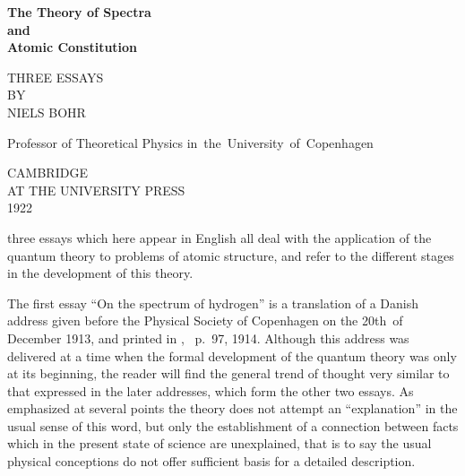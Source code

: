 {\small\raggedright
 \TransNoteText

 }
\iffalse
The Theory of Spectra
and
Atomic Constitution
\PageSep{ii}

CAMBRIDGE UNIVERSITY PRESS
C. F. CLAY, Manager
LONDON : FETTER LANE, E.C. 4


LONDON : H. K. LEWIS AND CO., Ltd.,
136 Gower Street, W.C. 1
NEW YORK : THE MACMILLAN CO.
BOMBAY   }
CALCUTTA } MACMILLAN AND CO., Ltd.
MADRAS   }
TORONTO : THE MACMILLAN CO. OF
CANADA, Ltd.
TOKYO : MARUZEN-KABUSHIKI-KAISHA

ALL RIGHTS RESERVED
\fi
\newpage
\begin{center}
\Huge\bfseries
The Theory of Spectra \\
and \\
Atomic Constitution
\bigskip

\large\normalfont
THREE ESSAYS \\
BY \\
\Large
NIELS BOHR
\medskip

\normalsize
Professor of Theoretical Physics in~the~University~of~Copenhagen
\vfill

\Large
CAMBRIDGE \\
AT THE UNIVERSITY PRESS \\
1922
\end{center}
\newpage
{}

\FrontMatter

\Preface

 three essays which here appear in English all deal with
the application of the quantum theory to problems of atomic
structure, and refer to the different stages in the development of
this theory.

The first essay ``On the spectrum of hydrogen'' is a translation of
a Danish address given before the Physical Society of Copenhagen
on the 20th~of December 1913, and printed in ,
\ p.~97, 1914. Although this address was delivered at a time
when the formal development of the quantum theory was only at
its beginning, the reader will find the general trend of thought
very similar to that expressed in the later addresses, which
form the other two essays. As emphasized at several points the
theory does not attempt an ``explanation'' in the usual sense of
this word, but only the establishment of a connection between facts
which in the present state of science are unexplained, that is to
say the usual physical conceptions do not offer sufficient basis for
a detailed description.

